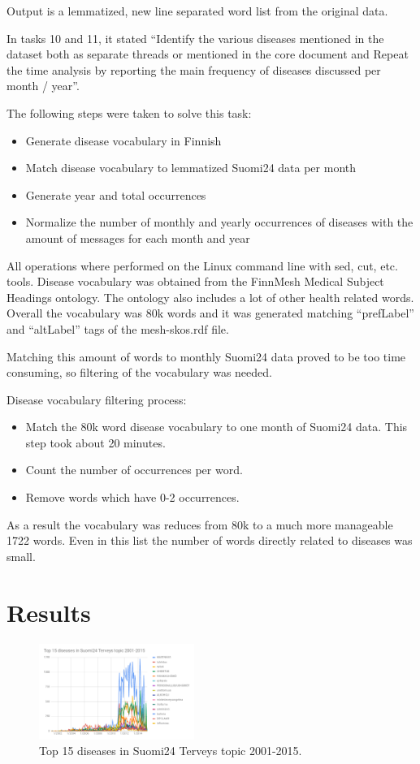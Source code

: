 \documentclass[conference]{IEEEtran}
\begin{document}
Output is a lemmatized, new line separated word list from the original data.

In tasks 10 and 11, it stated “Identify the various diseases mentioned in the dataset both as separate threads or mentioned in the core document and Repeat the time analysis by reporting the main frequency of diseases discussed per month / year”.

The following steps were taken to solve this task:
\begin{itemize}
    \item Generate disease vocabulary in Finnish
    \item Match disease vocabulary to lemmatized Suomi24 data per month
    \item Generate year and total occurrences
    \item Normalize the number of monthly and yearly occurrences of diseases with the amount of messages for each month and year
\end{itemize}

All operations where performed on the Linux command line with sed, cut, etc. tools. Disease vocabulary was obtained from the FinnMesh Medical Subject Headings ontology. The ontology also includes a lot of other health related words. Overall the vocabulary was 80k words and it was generated matching “prefLabel” and “altLabel” tags of the mesh-skos.rdf file.

Matching this amount of words to monthly Suomi24 data proved to be too time consuming, so filtering of the vocabulary was needed.

Disease vocabulary filtering process:
\begin{itemize}
    \item Match the 80k word disease vocabulary to one month of Suomi24 data. This step took about 20 minutes.
    \item Count the number of occurrences per word.
    \item Remove words which have 0-2 occurrences.
\end{itemize}

As a result the vocabulary was reduces from 80k to a much more manageable 1722 words. Even in this list the number of words directly related to diseases was small.

\section{Results}

\begin{figure}[htbp]
    \centerline{\includegraphics[width=0.45\textwidth]{figures/fig17.png}}
    \caption{Top 15 diseases in Suomi24 Terveys topic 2001-2015.}
    \label{top_15_diseases_in_suomi24_terveys_topic_2001_2015}
\end{figure}
\end{document}
